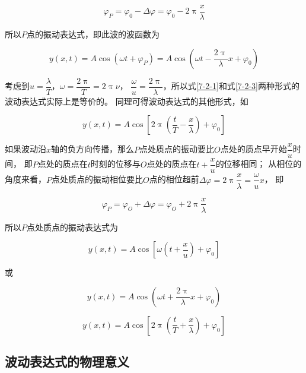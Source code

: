 \documentclass[12pt, a4paper]{article}
\numberwithin{equation}{section}
\begin{document}
    \begin{equation}
        \varphi_P=\varphi_0-\Delta \varphi=\varphi_0-2 \uppi \frac{x}{\lambda}
    \end{equation}

    所以\(P \)点的振动表达式，即此波的波函数为

    \begin{equation}
        y(x, t)=A \cos \left(\omega t+\varphi_P\right)=A \cos \left(\omega t-\frac{2 \uppi}{\lambda} x+\varphi_0\right)
        \label{7-2-3}
    \end{equation}

    考虑到\(u = \dfrac{\lambda }{T }\)，\(\omega = \dfrac{2 \uppi}{T } = 2 \uppi \nu\)，
    \(\dfrac{\omega}{u}=\dfrac{2 \uppi}{\lambda}\)，所以式\ref{7-2-1}和式\ref{7-2-3}两种形式的波动表达式实际上是等价的。
    同理可得波动表达式的其他形式，如

    \begin{equation}
        y(x, t)=A \cos \left[2 \uppi\left(\frac{t}{T}-\frac{x}{\lambda}\right)+\varphi_0\right]
    \end{equation}

    如果波动沿\(x \)轴的负方向传播，那么\(P \)点处质点的振动要比\(O \)点处的质点早开始\(\dfrac{x }{u }\)时间，
    即\(P\)点处的质点在\(t\)时刻的位移与\(O\)点处的质点在\(t + \dfrac{x }{u }\)的位移相同；
    从相位的角度来看，\(P \)点处质点的振动相位要比\(O \)点的相位超前$\Delta \varphi=2 \uppi \dfrac{x}{\lambda}=\dfrac{\omega}{u} x$，
    即

    $$
        \varphi_P=\varphi_O+\Delta \varphi=\varphi_O+2 \uppi \frac{x}{\lambda}
    $$

    所以\(P \)点处质点的振动表达式为

    \begin{equation}
        y(x, t)=A \cos \left[\omega\left(t+\frac{x}{u}\right)+\varphi_0\right]
    \end{equation}
    
    或

    \begin{equation}
        y(x, t)=A \cos \left(\omega t+\frac{2 \uppi}{\lambda} x+\varphi_0\right)
    \end{equation}

    \begin{equation}
        y(x, t)=A \cos \left[2 \uppi\left(\frac{t}{T}+\frac{x}{\lambda}\right)+\varphi_0\right]
    \end{equation}

\subsection{波动表达式的物理意义}
\end{document}
